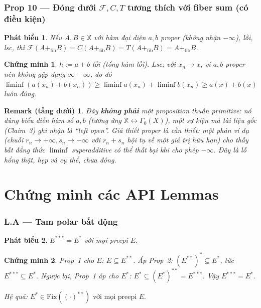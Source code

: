 \documentclass[11pt]{article}
\theoremstyle{plainlabel}
\newtheorem*{phatbieu}{Phát biểu}
\newtheorem*{chungminh}{Chứng minh}
\newtheorem*{remarkbox}{Remark (tầng dưới)}
\begin{document}
\subsubsection*{Prop 10 --- Đóng dưới $\mathcal F,C,T$ tương thích với fiber sum (\textbf{có điều kiện})}
\begin{phatbieu} Nếu $A,B\in\mathbb X$ với hàm đại diện $a,b$ \emph{proper} (không nhận $-\infty$), lồi, lsc, thì $\mathcal F(A+_{\mathrm{fib}}B)=C(A+_{\mathrm{fib}}B)=T(A+_{\mathrm{fib}}B)=A+_{\mathrm{fib}}B$. \end{phatbieu}
\begin{chungminh} $h:=a+b$ lồi (tổng hàm lồi). Lsc: với $x_n\to x$, vì $a,b$ proper nên không gặp dạng $\infty-\infty$, do đó $\liminf(a(x_n)+b(x_n))\ge\liminf a(x_n)+\liminf b(x_n)\ge a(x)+b(x)$ luôn đúng. \end{chungminh}
\begin{remarkbox}
Đây \textbf{không phải} một proposition thuần primitive: nó dùng biểu diễn hàm số $a,b$ (tương ứng $\mathbb X\leftrightarrow\Gamma_0(X)$), một sự kiện mà tài liệu gốc (Claim~3) ghi nhận là \emph{``left open''}. Giả thiết \emph{proper} là cần thiết: một phản ví dụ (chuỗi $r_n\to+\infty,s_n\to-\infty$ với $r_n+s_n$ hội tụ về một giá trị hữu hạn) cho thấy bất đẳng thức $\liminf$ superadditive có thể thất bại khi cho phép $-\infty$. Đây là lỗ hổng thật, hẹp và cụ thể, chưa đóng.
\end{remarkbox}

\section{Chứng minh các API Lemmas}
\label{sec:lemmas}

\subsubsection*{L.A --- Tam polar bất động}
\begin{phatbieu} $E^{***}=E^*$ với mọi preepi $E$. \end{phatbieu}
\begin{chungminh} Prop~1 cho $E$: $E\subseteq E^{**}$. Áp Prop~2: $(E^{**})^*\subseteq E^*$, tức $E^{***}\subseteq E^*$. Ngược lại, Prop~1 áp cho $E^*$: $E^*\subseteq(E^*)^{**}=E^{***}$. Vậy $E^{***}=E^*$. \end{chungminh}
\emph{Hệ quả:} $E^*\in\mathrm{Fix}((\cdot)^{**})$ với mọi preepi $E$.
\end{document}
